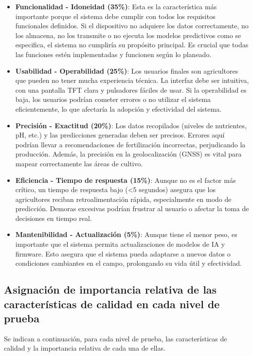 \documentclass[12pt,a4paper, twosite]{article}
\begin{document}
\begin{itemize}
  \item \textbf{Funcionalidad - Idoneidad (35\%)}: Esta es la característica más importante porque el sistema debe cumplir con todos los requisitos funcionales definidos. Si el dispositivo no adquiere los datos correctamente, no los almacena, no los transmite o no ejecuta los modelos predictivos como se especifica, el sistema no cumpliría su propósito principal. Es crucial que todas las funciones estén implementadas y funcionen según lo planeado.
  
  \item \textbf{Usabilidad - Operabilidad (25\%)}: Los usuarios finales son agricultores que pueden no tener mucha experiencia técnica. La interfaz debe ser intuitiva, con una pantalla TFT clara y pulsadores fáciles de usar. Si la operabilidad es baja, los usuarios podrían cometer errores o no utilizar el sistema eficientemente, lo que afectaría la adopción y efectividad del sistema.
  
  \item \textbf{Precisión - Exactitud (20\%)}: Los datos recopilados (niveles de nutrientes, pH, etc.) y las predicciones generadas deben ser precisos. Errores aquí podrían llevar a recomendaciones de fertilización incorrectas, perjudicando la producción. Además, la precisión en la geolocalización (GNSS) es vital para mapear correctamente las áreas de cultivo.
  
  \item \textbf{Eficiencia - Tiempo de respuesta (15\%)}: Aunque no es el factor más crítico, un tiempo de respuesta bajo (<5 segundos) asegura que los agricultores reciban retroalimentación rápida, especialmente en modo de predicción. Demoras excesivas podrían frustrar al usuario o afectar la toma de decisiones en tiempo real.
  
  \item \textbf{Mantenibilidad - Actualización (5\%)}: Aunque tiene el menor peso, es importante que el sistema permita actualizaciones de modelos de IA y firmware. Esto asegura que el sistema pueda adaptarse a nuevos datos o condiciones cambiantes en el campo, prolongando su vida útil y efectividad.
\end{itemize}

\subsection{Asignación de importancia relativa de las características de calidad en cada nivel de prueba}
Se indican a continuación, para cada nivel de prueba, las características de calidad y la importancia relativa de cada una de ellas.
\end{document}
